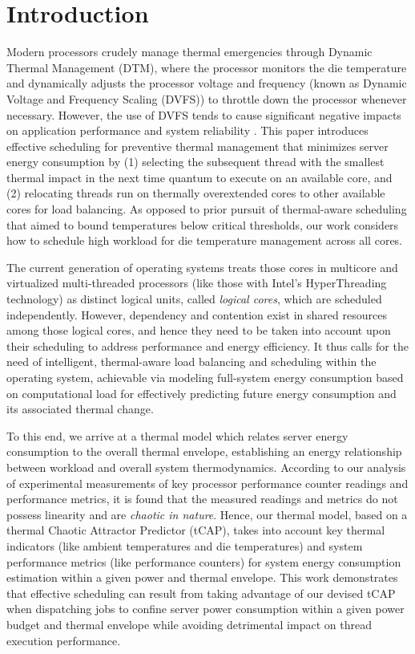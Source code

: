 \documentclass[times, 10pt,twocolumn]{IEEEtran}
\begin{document}
\section{Introduction}
\label{sec:Introduction}
Modern processors crudely manage thermal emergencies through Dynamic
Thermal Management (DTM), where the processor monitors the die
temperature and dynamically adjusts the processor voltage and frequency
(known as Dynamic Voltage and Frequency Scaling (DVFS)) to throttle down
the processor whenever necessary. However, the use of DVFS tends to
cause significant negative impacts on application performance and system
reliability \cite{Bircher2008,Coskun2008d,Donald2006}. This paper
introduces effective scheduling for preventive thermal management that
minimizes server energy consumption by (1) selecting the subsequent
thread with the smallest thermal impact in the next time quantum to
execute on an available core, and (2) relocating threads run on
thermally overextended cores to other available cores for load
balancing.  As opposed to prior pursuit of thermal-aware scheduling
\cite{Choi2007,Sarood2011,Yang2008} that aimed to bound temperatures
below critical thresholds, our work considers how to schedule high
workload for die temperature management across all cores.

The current generation of operating systems treats those cores in
multicore and virtualized multi-threaded processors (like those with
Intel's HyperThreading technology) as distinct logical units, called
\textit{logical cores}, which are scheduled independently.  However,
dependency and contention exist in shared resources among those logical
cores, and hence they need to be taken into account upon their
scheduling to address performance and energy efficiency. It thus calls
for the need of intelligent, thermal-aware load balancing and scheduling
within the operating system, achievable via modeling full-system energy
consumption based on computational load for effectively predicting
future energy consumption and its associated thermal change.

To this end, we arrive at a thermal model which relates server energy
consumption to the overall thermal envelope, establishing an energy
relationship between workload and overall system thermodynamics.
According to our analysis of experimental measurements of key processor
performance counter readings and performance metrics, it is found that
the measured readings and metrics do not possess linearity and are
\textit{chaotic in nature}.  Hence, our thermal model, based on a
thermal Chaotic Attractor Predictor (tCAP), takes into account key
thermal indicators (like ambient temperatures and die temperatures) and
system performance metrics (like performance counters) for system energy
consumption estimation within a given power and thermal envelope.  This
work demonstrates that effective scheduling can result from taking
advantage of our devised tCAP when dispatching jobs to confine server
power consumption within a given power budget and thermal envelope while
avoiding detrimental impact on thread execution performance.
\end{document}
